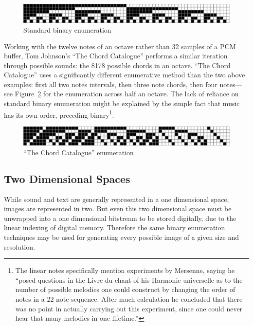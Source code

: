 \documentclass{thesis}
\begin{document}
\begin{figure}
	\begin{center}
		\includegraphics[scale=.8]{graphics/binary-bitmap.pdf}
		\caption{Standard binary enumeration}
		\label{binary-bitmap}
	\end{center}
\end{figure}

Working with the twelve notes of an octave rather than 32 samples of a PCM buffer, Tom Johnson's ``The Chord Catalogue''\cite{tom_johnson_liner_1999} performs a similar iteration through possible sounds: the 8178 possible chords in an octave. ``The Chord Catalogue'' uses a significantly different enumerative method than the two above examples: first all two notes intervals, then three note chords, then four notes---see Figure~\ref{chord-bitmap} for the enumeration across half an octave. The lack of reliance on standard binary enumeration might be explained by the simple fact that music has its own order, preceding binary\footnote{The linear notes specifically mention experiments by Mersenne, saying he ``posed questions in the Livre du chant of his Harmonie universelle as to the number of possible melodies one could construct by changing the order of notes in a 22-note sequence. After much calculation he concluded that there was no point in actually carrying out this experiment, since one could never hear that many melodies in one lifetime.''}.

\begin{figure}
	\begin{center}
		\includegraphics[scale=.8]{graphics/chord-bitmap.pdf}
		\caption{``The Chord Catalogue'' enumeration}
		\label{chord-bitmap}
	\end{center}
\end{figure}

\subsection{Two Dimensional Spaces}

While sound and text are generally represented in a one dimensional space, images are represented in two. But even this two dimensional space must be unwrapped into a one dimensional bitstream to be stored digitally, due to the linear indexing of digital memory. Therefore the same binary enumeration techniques may be used for generating every possible image of a given size and resolution.
	
\end{document}
